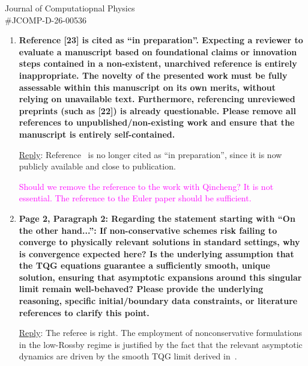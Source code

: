 \documentclass[letter,11pt]{letter}
\begin{document}
\begin{letter}{Journal of Computatiopnal Physics\\\#JCOMP-D-26-00536}
\begin{enumerate}
\medskip
{\sc\underline{Reply}}: We thank the referee for this comment. We agree that the physical regime addressed by the TRSW model should be better clarified. 
%
Two-dimensional rotating shallow-water-type models have a long and well-established history in geophysical fluid dynamics and numerical weather prediction. Several of the references suggested by the referee~\cite{machenhauer1977dynamics,temperton1987efficient,ritchie1988application,staniforth1991semi,smolarkiewicz2016finite,thuburn2014mimetic,weller2014non} are precisely formulated in such two-dimensional shallow-water settings.


{\large \textcolor{magenta}{Alex, you told me you have a paper with Zeitlin with a review. Do you want to add a remark on this?}}

\item 
{\bf Reference [23] is cited as ``in preparation''. Expecting a reviewer to evaluate a manuscript based on foundational claims or innovation steps contained in a non-existent, unarchived reference is entirely inappropriate. The novelty of the presented work must be fully assessable within this manuscript on its own merits, without relying on unavailable text. Furthermore, referencing unreviewed preprints (such as [22]) is already questionable. Please remove all references to unpublished/non-existing work and ensure that the manuscript is entirely self-contained.}

\medskip
{\sc\underline{Reply}}: Reference~\cite{CKKM} is no longer cited as ``in preparation'', since it is now publicly available and close to publication.


{\large \textcolor{magenta}{Should we remove the reference to the work with Qincheng? It is not essential. The reference to the Euler paper should be sufficient.}}

\item 
{\bf Page 2, Paragraph 2: Regarding the statement starting with ``On the other hand...'': If non-conservative schemes risk failing to converge to physically relevant solutions in standard settings, why is convergence expected here? Is the underlying assumption that the TQG equations guarantee a sufficiently smooth, unique solution, ensuring that asymptotic expansions around this singular limit remain well-behaved? Please provide
the underlying reasoning, specific initial/boundary data constraints, or literature references to clarify this point.}

\medskip
{\sc\underline{Reply}}: The referee is right. The employment of nonconservative formulations in the low-Rossby regime is justified by the fact that the relevant asymptotic dynamics are driven by the smooth TQG limit derived in~\cite{Warneford_2013}. 


\end{enumerate}
\end{letter}
\end{document}
